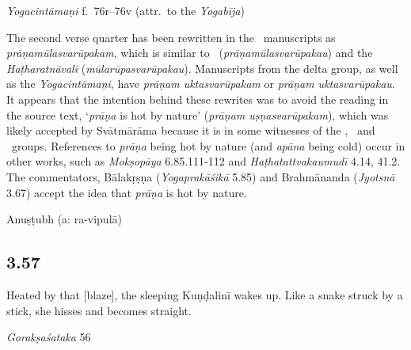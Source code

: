 \begin{ekdosis}
\begin{testimonia}[hp03_056]
\emph{Yogacintāmaṇi} f.~76r–76v (attr.~to the \emph{Yogabīja})
\begin{versinnote}
\end{versinnote}

\end{testimonia}

\begin{philcomm}[hp03_056]
The second verse quarter has been rewritten in the \textalpha\ manuscripts as \emph{prāṇamūlasvarūpakam}, which is similar to \etaOne\ (\emph{prāṇamūlasvarūpakau}) and the \emph{Haṭharatnāvalī} (\emph{mūlarūpasvarūpakau}). Manuscripts from the delta group, as well as the \emph{Yogacintāmaṇi}, have \emph{prāṇam uktasvarūpakam} or \emph{prāṇam uktasvarūpakau}. It appears that the intention behind these rewrites was to avoid the reading in the source text, `\textit{prāṇa} is hot by nature' (\emph{prāṇam uṣṇasvarūpakam}), which was likely accepted by Svātmārāma because it is in some witnesses of the \textbeta, \textgamma\ and \textepsilon\ groups. References to \emph{prāṇa} being hot by nature (and \emph{apāna} being cold) occur in other works, such as \emph{Mokṣopāya} 6.85.111-112 and \emph{Haṭhatattvakaumudī} 4.14, 41.2. The commentators, Bālakṛṣṇa (\emph{Yogaprakāśikā} 5.85) and Brahmānanda (\emph{Jyotsnā} 3.67) accept the idea that \emph{prāṇa} is hot by nature.
%

\end{philcomm}

\begin{metre}[hp03_056]
Anuṣṭubh (a: ra-vipulā)
\end{metre}

\subsection*{3.57}
\begin{translation}[hp03_057]
Heated by that [blaze], the sleeping Kuṇḍalinī wakes up. Like a snake struck by a stick, she hisses and becomes straight.
\end{translation}

\begin{sources}[hp03_057]
\emph{Gorakṣaśataka} 56
\begin{versinnote}
\end{versinnote}
\end{sources}


\end{ekdosis}
